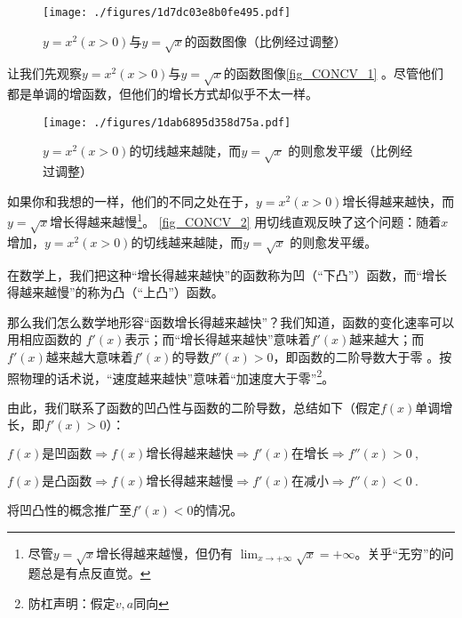 

\begin{figure}[ht]
\centering
\texttt{[image: ./figures/1d7dc03e8b0fe495.pdf]}
\caption{$y=x^2 (x>0)$与$y=\sqrt{x}$的函数图像（比例经过调整）} \label{fig_CONCV_1}
\end{figure}

让我们先观察$y=x^2 (x>0)$与$y=\sqrt{x}$的函数图像\autoref{fig_CONCV_1} 。尽管他们都是单调的增函数，但他们的增长方式却似乎不太一样。

\begin{figure}[ht]
\centering
\texttt{[image: ./figures/1dab6895d358d75a.pdf]}
\caption{$y=x^2 (x>0)$的切线越来越陡，而$y=\sqrt{x}$ 的则愈发平缓（比例经过调整）} \label{fig_CONCV_2}
\end{figure}

如果你和我想的一样，他们的不同之处在于，$y=x^2 (x>0)$增长得越来越快，而$y=\sqrt{x}$增长得越来越慢\footnote{尽管$y=\sqrt{x}$增长得越来越慢，但仍有 $\lim_{x\to+\infty} \sqrt{x} = +\infty$。关乎“无穷”的问题总是有点反直觉。}。
\autoref{fig_CONCV_2} 用切线直观反映了这个问题：随着$x$增加，$y=x^2 (x>0)$的切线越来越陡，而$y=\sqrt{x}$ 的则愈发平缓。

在数学上，我们把这种“增长得越来越快”的函数称为凹（“下凸”）函数，而“增长得越来越慢”的称为凸（“上凸”）函数。

那么我们怎么数学地形容“函数增长得越来越快”？我们知道，函数的变化速率可以用相应函数的 $f'(x)$表示；而“增长得越来越快”意味着$f'(x)$越来越大；而$f'(x)$越来越大意味着$f'(x)$的导数$f''(x)>0$，即函数的二阶导数大于零  。按照物理的话术说，“速度越来越快”意味着“加速度大于零”\footnote{防杠声明：假定$v,a$同向}。

由此，我们联系了函数的凹凸性与函数的二阶导数，总结如下（假定$f(x)$单调增长，即$f'(x)>0$）：

$f(x)\text{是凹函数} \Rightarrow f(x)\text{增长得越来越快}\Rightarrow f'(x)\text{在增长} \Rightarrow f''(x)>0~,$

$f(x)\text{是凸函数} \Rightarrow f(x)\text{增长得越来越慢}\Rightarrow f'(x)\text{在减小} \Rightarrow f''(x)<0~.$

\begin{exercise}{}
将凹凸性的概念推广至$f'(x)<0$的情况。
\end{exercise}
